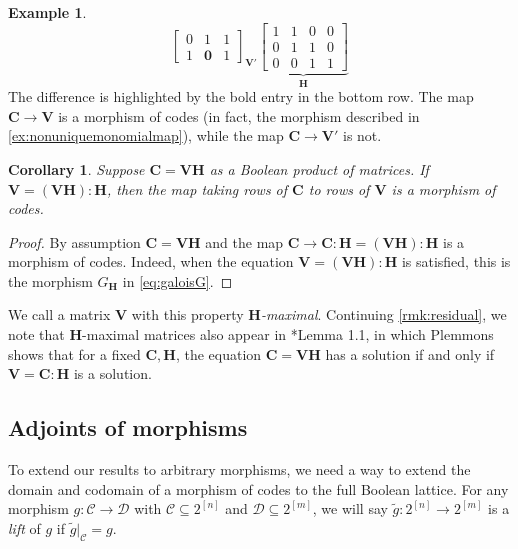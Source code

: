 \documentclass[11pt,letterpaper, reqno]{amsart}
\newtheorem{cor}[thm]{Corollary}     %
\theoremstyle{definition}
\newtheorem{ex}[thm]{Example}        %
\def\bC{\mathbf{C}}
\def\bH{\mathbf{H}}
\def\bV{\mathbf{V}}
\def\cC{\mathcal{C}}
\def\cD{\mathcal{D}}
\begin{document}
\begin{ex}
\[{\begin{bmatrix}
                0 & 1 & 1\\
                1 & \mathbf{0} & 1
                \end{bmatrix}}_{\bV'}
                \underbrace{\begin{bmatrix}
                1 & 1 & 0 & 0\\
                0 & 1 & 1 & 0\\
                0 & 0 & 1 & 1
                \end{bmatrix}}_{\bH}
                \]
            The difference is highlighted by the bold entry in the bottom row. The map $\bC \to \bV$ is a morphism of codes (in fact, the morphism described in \cref{ex:nonuniquemonomialmap}), while the map $\bC \to \bV'$ is not.
        \end{ex}

        \begin{cor}\label{lem:Hmaximalfactorizationmorphism}
            Suppose $\bC = \bV\bH$ as a Boolean product of matrices.
            If $\bV = (\bV\bH):\bH$, then the map taking rows of $\bC$ to rows of $\bV$ is a morphism of codes.
        \end{cor}
        \begin{proof}
            By assumption $\bC = \bV\bH$ and the map $\bC \to \bC : \bH = (\bV\bH):\bH$ is a morphism of codes. Indeed, when the equation $\bV = (\bV\bH):\bH$ is satisfied, this is the morphism $G_\bH$ in \eqref{eq:galoisG}.
        \end{proof}
        \noindent We call a matrix $\bV$ with this property \emph{$\bH$-maximal}. 
        Continuing \cref{rmk:residual}, we note that $\bH$-maximal matrices also appear in \cite{plemmons1971generalized}*{Lemma 1.1}, in which Plemmons shows that for a fixed $\bC,\bH$, the equation $\bC = \bV\bH$ has a solution if and only if $\bV = \bC:\bH$ is a solution.

        
        


    \subsection{Adjoints of morphisms} %
        To extend our results to arbitrary morphisms, 
        we need a way to extend the domain and codomain of a morphism of codes to the full Boolean lattice. For any morphism $g: \cC \to \cD$ with $\cC \subseteq 2^{[n]}$ and $\cD \subseteq 2^{[m]}$, we will say $\tilde{g}: 2^{[n]} \to 2^{[m]}$ is a \emph{lift} of $g$ if $\tilde{g}|_\cC = g$.
\end{document}
